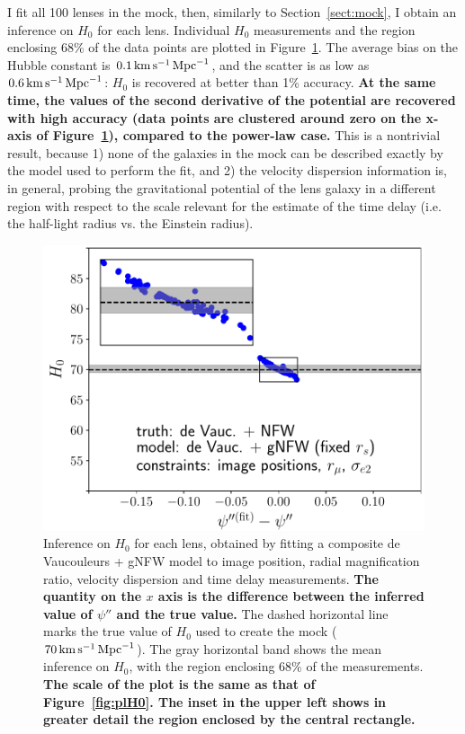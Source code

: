\documentclass[usenatbib]{mnras}
\def\psiii{\psi''}
\def\Hunit{\,\rm{km}\,{s}^{-1}\,\rm{Mpc}^{-1}}
\def\Sref#1{Section~\ref{#1}\xspace}
\def\Fref#1{Figure~\ref{#1}\xspace}
\begin{document}
I fit all 100 lenses in the mock, then, similarly to \Sref{sect:mock}, I obtain an inference on $H_0$ for each lens.
Individual $H_0$ measurements and the region enclosing 68\% of the data points are plotted in \Fref{fig:gnfw_indH0}.
The average bias on the Hubble constant is $0.1\Hunit$, and the scatter is as low as $0.6\Hunit$: $H_0$ is recovered at better than 1\% accuracy.
{\bf At the same time, the values of the second derivative of the potential are recovered with high accuracy (data points are clustered around zero on the x-axis of \Fref{fig:gnfw_indH0}), compared to the power-law case.}
This is a nontrivial result, because 1) none of the galaxies in the mock can be described exactly by the model used to perform the fit, and 2) the velocity dispersion information is, in general, probing the gravitational potential of the lens galaxy in a different region with respect to the scale relevant for the estimate of the time delay (i.e. the half-light radius vs. the Einstein radius).
%
\begin{figure}
 \includegraphics[width=\columnwidth]{gnfw_individual_H0.pdf}
 \caption{Inference on $H_0$ for each lens, obtained by fitting a composite de Vaucouleurs + gNFW model to image position, radial magnification ratio, velocity dispersion and time delay measurements.
{\bf The quantity on the $x$ axis is the difference between the inferred value of $\psiii$ and the true value.} The dashed horizontal line marks the true value of $H_0$ used to create the mock ($70\,\rm{km}\,\rm{s}^{-1}\,\rm{Mpc}^{-1}$).
The gray horizontal band shows the mean inference on $H_0$, with the region enclosing 68\% of the measurements.
{\bf The scale of the plot is the same as that of \Fref{fig:plH0}. The inset in the upper left shows in greater detail the region enclosed by the central rectangle.}
}
 \label{fig:gnfw_indH0}
\end{figure}
%
\end{document}
